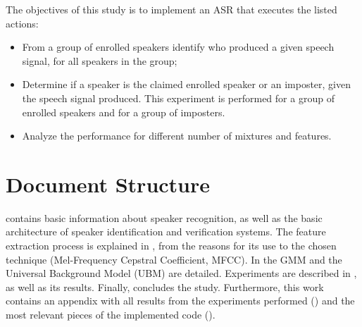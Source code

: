 The objectives of this study is to implement an ASR that executes the listed actions:

\begin{itemize}\itemsep0pt
    \item From a group of enrolled speakers identify who produced a given speech signal, for all speakers in the group;
    \item Determine if a speaker is the claimed enrolled speaker or an imposter, given the speech signal produced. This experiment is performed for a group of enrolled speakers and for a group of imposters.
    \item Analyze the performance for different number of mixtures and features.
\end{itemize}

\section{Document Structure}

 contains basic information about speaker recognition, as well as the basic architecture of speaker identification and verification systems. The feature extraction process is explained in , from the reasons for its use to the chosen technique (Mel-Frequency Cepstral Coefficient, MFCC). In  the GMM and the Universal Background Model (UBM) are detailed. Experiments are described in , as well as its results. Finally,  concludes the study. Furthermore, this work contains an appendix with all results from the experiments performed () and the most relevant pieces of the implemented code ().